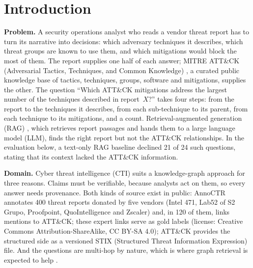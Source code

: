 \documentclass[conference,letterpaper]{IEEEtran}
\begin{document}
\section{Introduction}
\textbf{Problem.} A security operations analyst who reads a vendor threat report has to turn its narrative into decisions: which adversary techniques it describes, which threat groups are known to use them, and which mitigations would block the most of them. The report supplies one half of each answer; MITRE ATT\&CK (Adversarial Tactics, Techniques, and Common Knowledge) \cite{strom2020}, a curated public knowledge base of tactics, techniques, groups, software and mitigations, supplies the other. The question ``Which ATT\&CK mitigations address the largest number of the techniques described in report~$X$?'' takes four steps: from the report to the techniques it describes, from each sub-technique to its parent, from each technique to its mitigations, and a count. Retrieval-augmented generation (RAG) \cite{lewis2020}, which retrieves report passages and hands them to a large language model (LLM), finds the right report but not the ATT\&CK relationships. In the evaluation below, a text-only RAG baseline declined 21 of 24 such questions, stating that its context lacked the ATT\&CK information.

\textbf{Domain.} Cyber threat intelligence (CTI) suits a knowledge-graph approach for three reasons. Claims must be verifiable, because analysts act on them, so every answer needs provenance. Both kinds of source exist in public: AnnoCTR \cite{lange2024} annotates 400 threat reports donated by five vendors (Intel 471, Lab52 of S2 Grupo, Proofpoint, QuoIntelligence and Zscaler) and, in 120 of them, links mentions to ATT\&CK; these expert links serve as gold labels (license: Creative Commons Attribution-ShareAlike, CC BY-SA 4.0); ATT\&CK provides the structured side as a versioned STIX (Structured Threat Information Expression) file. And the questions are multi-hop by nature, which is where graph retrieval is expected to help \cite{gutierrez2024,peng2024}.
\end{document}
